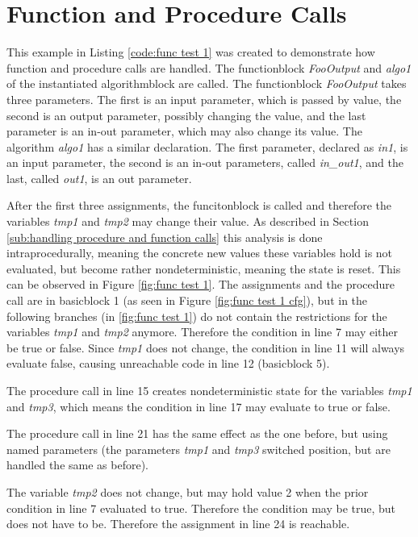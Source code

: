 \section{Function and Procedure Calls}
This example in Listing \ref{code:func test 1} was created to demonstrate how function and procedure calls are handled. The functionblock \emph{FooOutput} and \emph{algo1} of the instantiated algorithmblock are called. The functionblock \emph{FooOutput} takes three parameters. The first is an input parameter, which is passed by value, the second is an output parameter, possibly changing the value, and the last parameter is an in-out parameter, which may also change its value.
The algorithm \emph{algo1} has a similar declaration. The first parameter, declared as \emph{in1}, is an input parameter, the second is an in-out parameters, called \emph{in\_out1}, and the last, called \emph{out1}, is an out parameter.

After the first three assignments, the funcitonblock is called and therefore the variables \emph{tmp1} and \emph{tmp2} may change their value. As described in Section \ref{sub:handling procedure and function calls} this analysis is done intraprocedurally, meaning the concrete new values these variables hold is not evaluated, but become rather nondeterministic, meaning the state is reset. This can be observed in Figure \ref{fig:func test 1}. The assignments and the procedure call are in basicblock 1 (as seen in Figure \ref{fig:func test 1 cfg}), but in the following branches (in \ref{fig:func test 1}) do not contain the restrictions for the variables \emph{tmp1} and \emph{tmp2} anymore. Therefore the condition in line 7 may either be true or false.
Since \emph{tmp1} does not change,  the condition in line 11 will always evaluate false, causing unreachable code in line 12 (basicblock 5).

The procedure call in line 15 creates nondeterministic state for the variables \emph{tmp1} and \emph{tmp3}, which means the condition in line 17 may evaluate to true or false.

The procedure call in line 21 has the same effect as the one before, but using named parameters (the parameters \emph{tmp1} and \emph{tmp3} switched position, but are handled the same as before).

The variable \emph{tmp2} does not change, but may hold value 2 when the prior condition in line 7 evaluated to true. Therefore the condition may be true, but does not have to be. Therefore the assignment in line 24 is reachable. 

